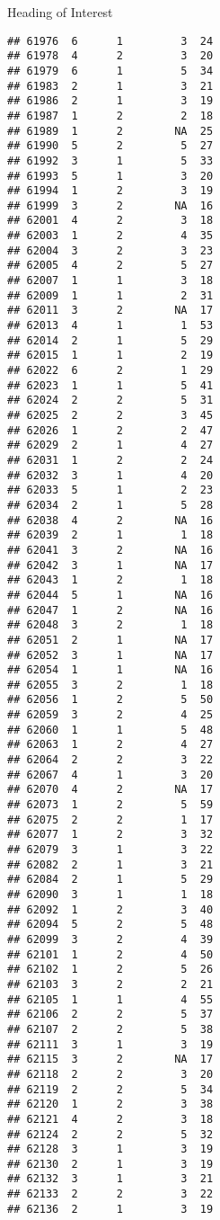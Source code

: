 \documentclass[
  ignorenonframetext,
]{beamer}
\begin{document}
\begin{frame}[fragile]{Heading of Interest}
\begin{verbatim}
## 61976  6      1         3  24
## 61978  4      2         3  20
## 61979  6      1         5  34
## 61983  2      1         3  21
## 61986  2      1         3  19
## 61987  1      2         2  18
## 61989  1      2        NA  25
## 61990  5      2         5  27
## 61992  3      1         5  33
## 61993  5      1         3  20
## 61994  1      2         3  19
## 61999  3      2        NA  16
## 62001  4      2         3  18
## 62003  1      2         4  35
## 62004  3      2         3  23
## 62005  4      2         5  27
## 62007  1      1         3  18
## 62009  1      1         2  31
## 62011  3      2        NA  17
## 62013  4      1         1  53
## 62014  2      1         5  29
## 62015  1      1         2  19
## 62022  6      2         1  29
## 62023  1      1         5  41
## 62024  2      2         5  31
## 62025  2      2         3  45
## 62026  1      2         2  47
## 62029  2      1         4  27
## 62031  1      2         2  24
## 62032  3      1         4  20
## 62033  5      1         2  23
## 62034  2      1         5  28
## 62038  4      2        NA  16
## 62039  2      1         1  18
## 62041  3      2        NA  16
## 62042  3      1        NA  17
## 62043  1      2         1  18
## 62044  5      1        NA  16
## 62047  1      2        NA  16
## 62048  3      2         1  18
## 62051  2      1        NA  17
## 62052  3      1        NA  17
## 62054  1      1        NA  16
## 62055  3      2         1  18
## 62056  1      2         5  50
## 62059  3      2         4  25
## 62060  1      1         5  48
## 62063  1      2         4  27
## 62064  2      2         3  22
## 62067  4      1         3  20
## 62070  4      2        NA  17
## 62073  1      2         5  59
## 62075  2      2         1  17
## 62077  1      2         3  32
## 62079  3      1         3  22
## 62082  2      1         3  21
## 62084  2      1         5  29
## 62090  3      1         1  18
## 62092  1      2         3  40
## 62094  5      2         5  48
## 62099  3      2         4  39
## 62101  1      2         4  50
## 62102  1      2         5  26
## 62103  3      2         2  21
## 62105  1      1         4  55
## 62106  2      2         5  37
## 62107  2      2         5  38
## 62111  3      1         3  19
## 62115  3      2        NA  17
## 62118  2      2         3  20
## 62119  2      2         5  34
## 62120  1      2         3  38
## 62121  4      2         3  18
## 62124  2      2         5  32
## 62128  3      1         3  19
## 62130  2      1         3  19
## 62132  3      1         3  21
## 62133  2      2         3  22
## 62136  2      1         3  19

\end{verbatim}
\end{frame}
\end{document}

